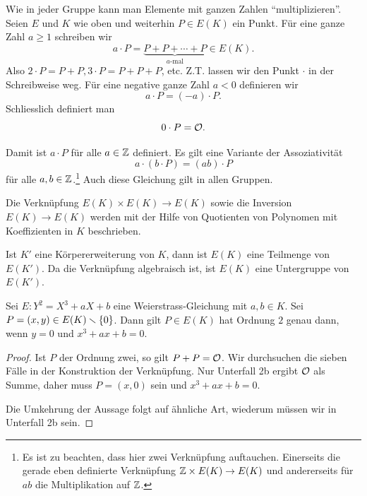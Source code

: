 Wie in jeder Gruppe kann man Elemente mit ganzen Zahlen
``multiplizieren''. Seien $E$ und $K$ wie oben und weiterhin $P\in
E(K)$ ein Punkt. Für eine ganze Zahl $a\ge 1$ schreiben wir
\begin{equation}
  \label{eq:amultP}
  a\cdot P = \underbrace{P+ P+\cdots +P}_{\text{$a$-mal}} \in E(K).
\end{equation}
Also $2\cdot P = P+P, 3\cdot P = P+P+P$, etc. Z.T. lassen wir den
Punkt $\cdot$ in der Schreibweise weg. 
Für eine negative ganze Zahl $a<0$ definieren wir
\begin{equation*}
  a\cdot P = (-a) \cdot P. 
\end{equation*}
Schliesslich definiert man
\begin{equation*}
  0\cdot P = {\mathcal O}.
\end{equation*}

Damit ist $a\cdot P$ für alle $a\in{\mathbb{Z}}$ definiert. Es gilt eine
Variante der Assoziativität
\begin{equation}
  \label{eq:actionofZ}
  a \cdot (b\cdot P) = (ab)\cdot P 
\end{equation}
für alle $a,b\in{\mathbb{Z}}$.\footnote{Es ist zu beachten, dass hier zwei
  Verknüpfung auftauchen. Einerseits die gerade eben definierte
  Verknüpfung ${\mathbb{Z}}\times E(K)\rightarrow E(K)$ und andererseits für
  $ab$ die
  Multiplikation auf ${\mathbb{Z}}$.} Auch diese Gleichung gilt in allen Gruppen.

\begin{bemerkung}
  Die Verknüpfung $E(K)\times
  E(K)\rightarrow E(K)$ sowie die Inversion $E(K)\rightarrow E(K)$
  werden mit der Hilfe von 
  Quotienten von Polynomen mit Koeffizienten in $K$ beschrieben.

  Ist $K'$ eine Körpererweiterung von $K$, dann ist $E(K)$ eine
  Teilmenge von $E(K')$. Da die Verknüpfung algebraisch ist, ist
  $E(K)$ eine Untergruppe von $E(K')$.
\end{bemerkung}


\begin{lemma}
  \label{lem:2torsion}
  Sei $E:Y^2 = X^3+aX+b$ eine Weierstrass-Gleichung mit $a,b\in K$.
  Sei $P=(x,y)\in E(K)\smallsetminus\{0\}$. Dann gilt
   $P\in E(K)$ hat Ordnung $2$ genau dann, wenn $y=0$ und $x^3+ax+b=0$.
\end{lemma}
\begin{proof}
  Ist $P$ der Ordnung zwei, so gilt $P+P={\mathcal O}$.
  Wir durchsuchen die sieben Fälle in der Konstruktion der
  Verknüpfung. Nur Unterfall 2b ergibt ${\mathcal O}$ als Summe, daher muss
  $P=(x,0)$ sein und $x^3+ax+b=0$.

  Die Umkehrung der Aussage folgt auf ähnliche Art, wiederum müssen
  wir in Unterfall 2b sein.
\end{proof}

